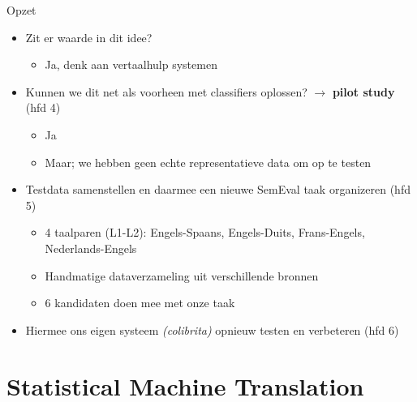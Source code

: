 \documentclass[8pt]{beamer}
\begin{document}
\begin{frame}
    \begin{block}{Opzet}
        \begin{itemize}
            \item Zit er waarde in dit idee?
            \begin{itemize}
                \item Ja, denk aan vertaalhulp systemen
            \end{itemize}
            \item Kunnen we dit net als voorheen met classifiers oplossen? $\rightarrow$
                \textbf{pilot study} (hfd 4)
            \begin{itemize}
                \item<2-> Ja
                \item<2-> Maar; we hebben geen echte representatieve data om op te testen
            \end{itemize}
        \item<3-> Testdata samenstellen en daarmee een nieuwe SemEval taak organizeren (hfd 5)
            \begin{itemize}
                \item<3-> 4 taalparen (L1-L2): Engels-Spaans, Engels-Duits, Frans-Engels, Nederlands-Engels
                \item<3-> Handmatige dataverzameling uit verschillende bronnen
                \item<3-> 6 kandidaten doen mee met onze taak
            \end{itemize}
            \item<3-> Hiermee ons eigen systeem \emph{(colibrita)} opnieuw testen en verbeteren (hfd 6)
        \end{itemize}
    \end{block}
\end{frame}

\section{Statistical Machine Translation}
\end{document}
